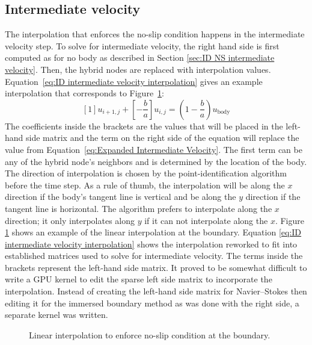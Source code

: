 \subsection{Intermediate velocity}
\label{sec:ID fadlun intermediate velocity}
The interpolation that enforces the no-slip condition happens in the intermediate velocity step. 
To solve for intermediate velocity, the right hand side is first computed as for no body as described in Section \ref{sec:ID NS intermediate velocity}. 
Then, the hybrid nodes are replaced with interpolation values. 
Equation~\eqref{eq:ID intermediate velocity interpolation} gives an example interpolation that corresponds to Figure~\ref{fig:ID linear interpolation}:
\begin{equation}
\left[1\right]u_{i+1,j} + \left[-\frac{b}{a}\right]u_{i,j} = \left(1-\frac{b}{a}\right)u_{\text{body}}
\label{eq:ID intermediate velocity interpolation}
\end{equation}
The coefficients inside the brackets are the values that will be placed in the left-hand side matrix and the term on the right side of the equation will replace the value from Equation~\eqref{eq:Expanded Intermediate Velocity}. 
The first term can be any of the hybrid node's neighbors and is determined by the location of the body. 
The direction of interpolation is chosen by the point-identification algorithm before the time step. 
As a rule of thumb, the interpolation will be along the $x$ direction if the body's tangent line is vertical and be along the $y$ direction if the tangent line is horizontal. 
The algorithm prefers to interpolate along the $x$ direction; it only interpolates along $y$ if it can not interpolate along the $x$. 
Figure \ref{fig:ID linear interpolation} shows an example of the linear interpolation at the boundary. 
Equation \eqref{eq:ID intermediate velocity interpolation} shows the interpolation reworked to fit into established matrices used to solve for intermediate velocity. 
The terms inside the brackets represent the left-hand side matrix. 
It proved to be somewhat difficult to write a GPU kernel to edit the sparse left side matrix to incorporate the interpolation. 
Instead of creating the left-hand side matrix for Navier--Stokes then editing it for the immersed boundary method as was done with the right side, a separate kernel was written. 

\begin{figure}[!htb]
	\centering
	
	\caption{Linear interpolation to enforce no-slip condition at the boundary.}
	\label{fig:ID linear interpolation}
\end{figure}

